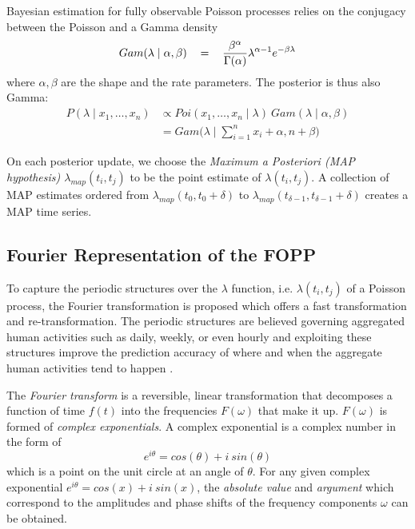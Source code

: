 Bayesian estimation for fully observable Poisson processes relies on the conjugacy between the Poisson and a Gamma density
\[
\begin{tabular}{rcl}
$Gam(\lambda \mid \alpha, \beta)$ & = & $\displaystyle\frac{\beta ^{\alpha}}{\Gamma (\alpha)} \lambda ^{\alpha - 1} e^{-\beta \lambda}$ \\ [1ex]
\end{tabular}
\]
where $\alpha, \beta$ are the shape and the rate parameters. The posterior is thus also Gamma:
\begin{equation}
\label{eq:bayes_poisson}
    \begin{array}{lll}
    P(\lambda \mid x_1, \ldots, x_n) & \varpropto Poi(x_1, \ldots, x_n \mid \lambda) ~ Gam(\lambda \mid \alpha, \beta) \\
     & = Gam \Bigg(\lambda \mid \displaystyle\sum_{i=1}^{n} x_i + \alpha, n + \beta \Bigg)
\end{array}
\end{equation}

On each posterior update, we choose the \textit{Maximum a Posteriori (MAP hypothesis) $\lambda_{map}(t_i, t_j)$} to be the point estimate of $\lambda(t_i, t_j)$. A collection of MAP estimates ordered from $\lambda_{map}(t_0, t_0 + \delta)$ to $\lambda_{map}(t_{\delta-1}, t_{\delta-1} + \delta)$ creates a MAP time series. 

\subsection{Fourier Representation of the FOPP}

To capture the periodic structures over the $\lambda$ function, i.e. $\lambda(t_i, t_j)$ of a Poisson process, the Fourier transformation is proposed which offers a fast transformation and re-transformation. The periodic structures are believed governing aggregated human activities such as daily, weekly, or even hourly and exploiting these structures improve the prediction accuracy of where and when the aggregate human activities tend to happen \cite{jovan_iros16}.

The \textit{Fourier transform} is a reversible, linear transformation that decomposes a function of time $f(t)$ into the frequencies $F(\omega)$ that make it up. $F(\omega)$ is formed of \textit{complex exponentials}. A complex exponential is a complex number in the form of 
\begin{equation*}
    e^{i\theta} = cos(\theta) + i~sin(\theta)
\end{equation*}
which is a point on the unit circle at an angle of $\theta$. For any given complex exponential $e^{i\theta} = cos(x) + i~sin(x)$, the \textit{absolute value} and \textit{argument} which correspond to the amplitudes and phase shifts of the frequency components $\omega$ can be obtained.

